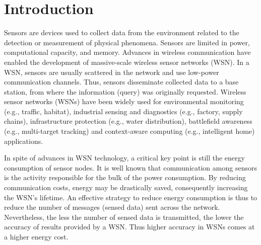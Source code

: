 \documentclass[conference]{IEEEtran}
\begin{document}





%
\IEEEpeerreviewmaketitle



\section{Introduction}


Sensors are devices used to collect data from the environment related to the
detection or measurement of physical phenomena. Sensors are limited in power,
computational capacity, and memory. Advances in wireless communication have
enabled the development of massive-scale wireless sensor networks (WSN). In a
WSN, sensors are usually scattered in the network and use low-power
communication channels. Thus, sensors disseminate collected data to a base
station, from where the information (query) was originally requested. Wireless
sensor networks (WSNs) have been widely used for environmental monitoring (e.g.,
traffic, habitat), industrial sensing and diagnostics (e.g., factory, supply
chains), infrastructure protection (e.g., water distribution), battlefield
awareness (e.g., multi-target tracking) and context-aware computing (e.g.,
intelligent home) applications.

In spite of advances in WSN technology, a critical key point is still the
energy consumption of sensor nodes. It is well known that communication among
sensors is the activity responsible for the bulk of the power consumption. By
reducing communication costs, energy may be drastically saved, consequently
increasing the WSN's lifetime. An effective strategy to reduce energy
consumption is thus to reduce the number of messages (sensed data) sent across
the network. Nevertheless, the less the number of sensed data is transmitted,
the lower the accuracy of results provided by a WSN. Thus higher accuracy in
WSNs comes at a higher energy cost.
\end{document}
